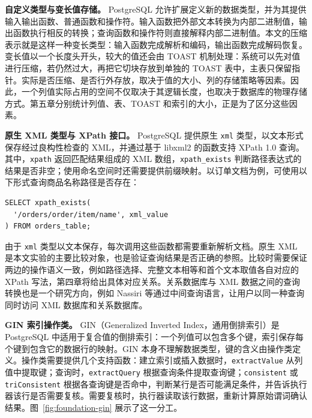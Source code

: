 \textbf{自定义类型与变长值存储。} PostgreSQL 允许扩展定义新的数据类型，并为其提供输入输出函数、普通函数和操作符。输入函数把外部文本转换为内部二进制值，输出函数执行相反的转换；查询函数和操作符则直接解释内部二进制值。本文的压缩表示就是这样一种变长类型：输入函数完成解析和编码，输出函数完成解码恢复。变长值以一个长度头开头，较大的值还会由 TOAST 机制处理：系统可以先对值进行压缩，若仍然过大，再把它切块存放到单独的 TOAST 表中，主表只保留指针\cite{pg16toast}。实际是否压缩、是否行外存放，取决于值的大小、列的存储策略等因素。因此，一个列值实际占用的空间不仅取决于其逻辑长度，也取决于数据库的物理存储方式。第五章分别统计列值、表、TOAST 和索引的大小，正是为了区分这些因素。

\textbf{原生 XML 类型与 XPath 接口。} PostgreSQL 提供原生 \texttt{xml} 类型，以文本形式保存经过良构性检查的 XML，并通过基于 libxml2 的函数支持 XPath 1.0 查询\cite{pg16xmltype,pg16xmlfunc}。其中，\texttt{xpath} 返回匹配结果组成的 XML 数组，\texttt{xpath\_exists} 判断路径表达式的结果是否非空；使用命名空间时还需要提供前缀映射。以订单文档为例，可使用以下形式查询商品名称路径是否存在：
\begin{lstlisting}[caption={PostgreSQL 原生 XML 路径存在查询},label={lst:foundation-pgxpath},numbers=none]
SELECT xpath_exists(
  '/orders/order/item/name', xml_value
) FROM orders_table;
\end{lstlisting}
由于 \texttt{xml} 类型以文本保存，每次调用这些函数都需要重新解析文档。原生 XML 是本文实验的主要比较对象，也是验证查询结果是否正确的参照。比较时需要保证两边的操作语义一致，例如路径选择、完整文本相等和首个文本取值各自对应的 XPath 写法，第四章将给出具体对应关系。关系数据库与 XML 数据之间的查询转换也是一个研究方向，例如 Nassiri 等通过中间查询语言，让用户以同一种查询同时访问 XML 数据库和关系数据库\cite{nassiri2018one}。

\textbf{GIN 索引操作类。} GIN（Generalized Inverted Index，通用倒排索引）是 PostgreSQL 中适用于复合值的倒排索引：一个列值可以包含多个键，索引保存每个键到包含它的数据行的映射\cite{pg16gin}。GIN 本身不理解数据类型，键的含义由操作类定义。操作类需要提供几个支持函数：建立索引或插入数据时，\texttt{extractValue} 从列值中提取键；查询时，\texttt{extractQuery} 根据查询条件提取查询键；\texttt{consistent} 或 \texttt{triConsistent} 根据各查询键是否命中，判断某行是否可能满足条件，并告诉执行器该行是否需要复核。需要复核时，执行器读取该行数据，重新计算原始谓词确认结果\cite{pg16gin}。图~\ref{fig:foundation-gin} 展示了这一分工。

